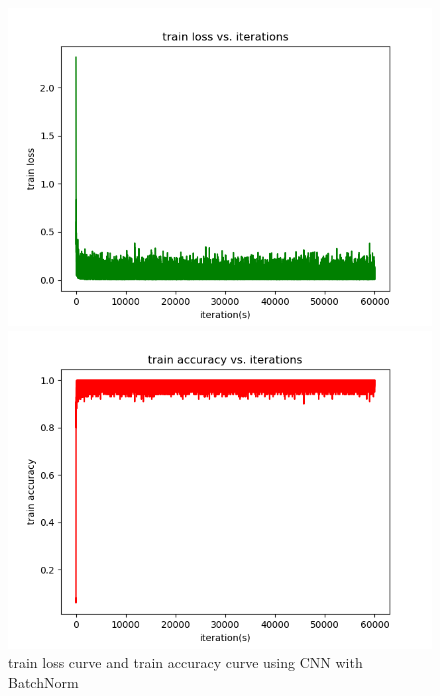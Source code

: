 \documentclass{elegantbook}
\begin{document}
\begin{figure}[!h]
	\centering
	\begin{minipage}[t]{0.48\textwidth}
		\centering
		\includegraphics[width=\textwidth]{../results/trainloss21}
	\end{minipage}
	\begin{minipage}[t]{0.48\textwidth}
		\centering
		\includegraphics[width=\textwidth]{../results/trainacc21}
	\end{minipage}
	\caption{\label{trainres21}train loss curve and train accuracy curve using CNN with BatchNorm}
\end{figure}
\end{document}
